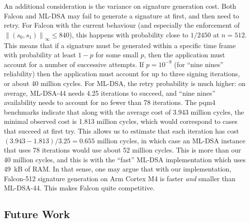 \documentclass{llncs}
\newcommand{\norm}[1]{\left\|#1\right\|}
\newcommand{\norminf}[1]{\norm{#1}_{\infty}}
\begin{document}
An additional consideration is the variance on signature generation
cost. Both Falcon and ML-DSA may fail to generate a signature at first,
and then need to retry. For Falcon with the current behaviour (and
especially the enforcement of $\norminf{(s_0, s_1)}\leq 840$), this
happens with probability close to $1/2450$ at $n = 512$. This means that
if a signature must be generated within a specific time frame with
probability at least $1 - p$ for some small $p$, then the application
must account for a number of successive attempts. If $p = 10^{-9}$ (for
``nine nines'' reliability) then the application must account for up to
three signing iterations, or about 40 million cycles. For ML-DSA, the
retry probability is much higher: on average, ML-DSA-44 needs 4.25
iterations to succeed, and ``nine nines'' availability needs to account
for no fewer than 78 iterations. The pqm4 benchmarks indicate that along
with the average cost of 3.943 million cycles, the minimal observed cost
is 1.813 million cycles, which would correspond to cases that succeed at
first try. This allows us to estimate that each iteration has cost
$(3.943 - 1.813)/3.25 = 0.655$ million cycles, in which case an ML-DSA
instance that uses 78 iterations would use about 52 million cycles. This
is more than our 40 million cycles, and this is with the ``fast'' ML-DSA
implementation which uses 49~kB of RAM. In that sense, one may argue
that with our implementation, Falcon-512 signature generation on Arm
Cortex M4 is faster \emph{and} smaller than ML-DSA-44. This makes Falcon
quite competitive.

\subsection{Future Work}
\end{document}
